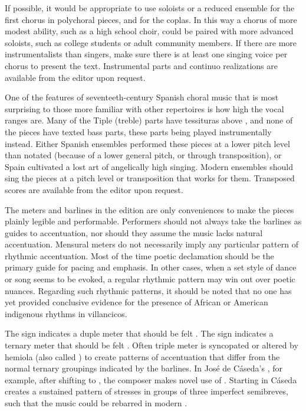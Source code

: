 If possible, it would be appropriate to use soloists or a reduced ensemble for
the first chorus in polychoral pieces, and for the coplas.
In this way a chorus of more modest ability, such as a high school choir, could
be paired with more advanced soloists, such as college students or adult
community members.
If there are more instrumentalists than singers, make sure there is at least one
singing voice per chorus to present the text.
Instrumental parts and continuo realizations are available from the editor upon
request.

One of the features of seventeeth-century Spanish choral music that is most
surprising to those more familiar with other repertoires is how high the vocal
ranges are.
Many of the Tiple (treble) parts have tessituras above , and none of
the pieces have texted bass parts, these parts being played instrumentally
instead.
Either Spanish ensembles performed these pieces at a lower pitch level than
notated (because of a lower general pitch, or through transposition), or Spain
cultivated a lost art of angelically high singing.
Modern ensembles should sing the pieces at a pitch level or transposition that
works for them.
Transposed scores are available from the editor upon request.

The meters and barlines in the edition are only conveniences to make the pieces
plainly legible and performable.
Performers should not always take the barlines as guides to accentuation, nor
should they assume the music lacks natural accentuation.
Mensural meters do not necessarily imply any particular pattern of rhythmic 
accentuation.
Most of the time poetic declamation should be the primary guide for pacing
and emphasis.
In other cases, when a set style of dance or song seems to be evoked, a regular
rhythmic pattern may win out over poetic nuances.
Regarding such rhythmic patterns, it should be noted that no one has yet
provided conclusive evidence for the presence of African or American indigenous
rhythms in villancicos.

The sign \meterC{} indicates a duple meter that should be felt .
The sign \meterCThree{} indicates a ternary meter that should be felt
.
Often triple meter is syncopated or altered by hemiola (also called
) to create patterns of accentuation that differ from the
normal ternary groupings indicated by the barlines.
In José de Cáseda's , for example, after shifting
to \meterCThree{}, the composer makes novel use of .
Starting in  Cáseda creates a sustained pattern of stresses in
groups of three imperfect semibreves, such that the music could be rebarred in
modern .

